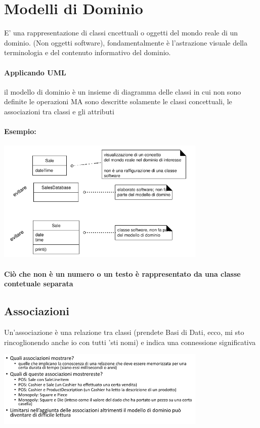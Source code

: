 \documentclass[12pt, a4paper, openany, twoside]{book}
\begin{document}
\section{Modelli di Dominio}
E' una rappresentazione di classi cncettuali o oggetti del mondo reale di un
dominio. (Non oggetti software), fondamentalmente è l'astrazione visuale della
terminologia e del contenuto informativo del dominio.
\paragraph{Applicando UML} il modello di dominio è un insieme di diagramma delle
classi in cui non sono definite le operazioni MA sono descritte solamente le
classi concettuali, le associazioni tra classi e gli attributi
\paragraph{Esempio:}
\begin{center}
\includegraphics[width=0.75\textwidth]{7}
\end{center}
\paragraph{Ciò che non è un numero o un testo è rappresentato da una classe
contetuale separata}
\subsection{Associazioni}
Un'associazione è una relazione tra classi (prendete Basi di Dati, ecco, mi sto
rincoglionendo anche io con tutti 'sti nomi) e indica una connessione significativa
\begin{center}
\includegraphics[width=0.75\textwidth]{8}
\end{center}
\end{document}

